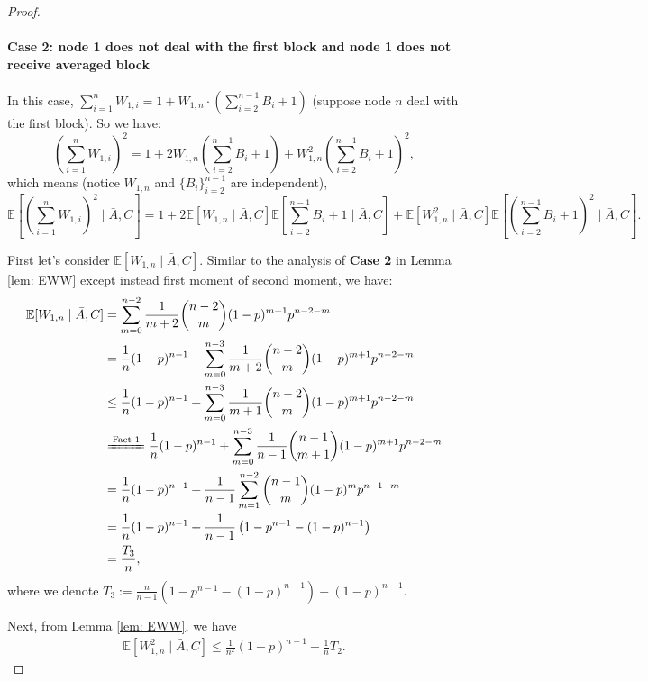 \begin{lemma}
\begin{proof}
\paragraph{Case 2: node 1 does not deal with the first block and node 1 does not receive averaged block} In this case, $\sum\limits_{i=1}^n W_{1,i} = 1 + W_{1,n}\cdot\left(\sum\limits_{i=2}^{n-1}B_i + 1\right)$ (suppose node $n$ deal with the first block). So we have:
\begin{equation*}
	\left(\sum\limits_{i=1}^n W_{1,i}\right)^2 = 1 + 2W_{1,n}\left(\sum\limits_{i=2}^{n-1}B_i + 1\right) + W_{1,n}^2\left(\sum\limits_{i=2}^{n-1}B_i+1\right)^2,
\end{equation*}
which means (notice $W_{1,n}$ and $\{B_i\}_{i=2}^{n-1}$ are independent),
\begin{equation*}
	\mathbb{E} \left[\left(\sum\limits_{i=1}^n W_{1,i}\right)^2\mid \bar{A},C\right] = 1 + 2\mathbb{E}\left[W_{1,n}\mid \bar{A},C\right]\mathbb{E} \left[\sum\limits_{i=2}^{n-1}B_i+1\mid \bar{A},C\right] + \mathbb{E}\left[W_{1,n}^2\mid \bar{A},C\right]\mathbb{E} \left[\left(\sum\limits_{i=2}^{n-1} B_i + 1\right)^2\mid \bar{A},C\right].
\end{equation*}

First let's consider $\mathbb{E}[W_{1,n}\mid \bar{A},C]$. Similar to the analysis of \textbf{Case 2} in Lemma \ref{lem: EWW} except instead first moment of second moment, we have:
\begin{align*}
	\mathbb{E}[W_{1,n}\mid \bar{A},C] &= \sum\limits_{m=0}^{n-2} \frac{1}{m+2}\binom{n-2}{m}(1-p)^{m+1}p^{n-2-m}\\
	&= \frac{1}{n}(1-p)^{n-1} + \sum\limits_{m=0}^{n-3} \frac{1}{m+2}\binom{n-2}{m}(1-p)^{m+1}p^{n-2-m}\\
	&\le \frac{1}{n}(1-p)^{n-1} + \sum\limits_{m=0}^{n-3} \frac{1}{m+1}\binom{n-2}{m}(1-p)^{m+1}p^{n-2-m}\\
	&\xlongequal{\text{Fact 1}}\frac{1}{n}(1-p)^{n-1} + \sum\limits_{m=0}^{n-3} \frac{1}{n-1}\binom{n-1}{m+1}(1-p)^{m+1}p^{n-2-m}\\
	&=\frac{1}{n}(1-p)^{n-1} + \frac{1}{n-1}\sum\limits_{m=1}^{n-2}\binom{n-1}{m}(1-p)^mp^{n-1-m}\\
	&=\frac{1}{n}(1-p)^{n-1} + \frac{1}{n-1}\left(1-p^{n-1} - (1-p)^{n-1}\right)\\
	& = \frac{T_3}{n},
\end{align*}
where we denote $T_3:= \frac{n}{n-1}\left(1-p^{n-1} - (1-p)^{n-1}\right) + (1-p)^{n-1}$.

Next, from Lemma \ref{lem: EWW}, we have 
\begin{align*}
\mathbb{E}\left[W_{1,n}^2\mid \bar{A},C\right]\le \frac{1}{n^2}(1-p)^{n-1} + \frac{1}{n}T_2.
\end{align*}


\end{proof}
\end{lemma}
